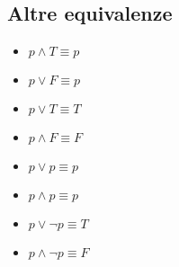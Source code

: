 \subsection{Altre equivalenze}
\begin{itemize}
    \item $p \wedge T \equiv p$
    \item $p \vee F \equiv p$
    \item $p \vee T \equiv T$
    \item $p \wedge F \equiv F$
    \item $p \vee p \equiv p$
    \item $p \wedge p \equiv p$
    \item $p \vee \neg p \equiv T$
    \item $p \wedge \neg p \equiv F$
\end{itemize}
